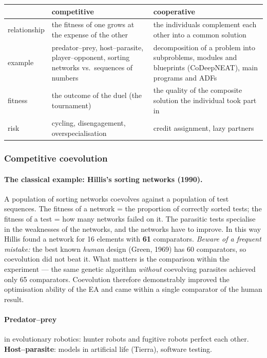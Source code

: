 \documentclass[11pt,a4paper]{article}
\theoremstyle{definition}
\begin{document}
\begin{center}
\begin{tabular}{@{}p{3cm}p{6cm}p{6cm}@{}}
\toprule
 & \textbf{competitive} & \textbf{cooperative} \\
\midrule
relationship & the fitness of one grows at the expense of the other &
  the individuals complement each other into a common solution \\
example & predator--prey, host--parasite, player--opponent, sorting networks
  vs.\ sequences of numbers & decomposition of a problem into subproblems,
  modules and blueprints (CoDeepNEAT), main programs and ADFs \\
fitness & the outcome of the duel (the tournament) & the quality of the
  composite solution the individual took part in \\
risk & cycling, disengagement, overspecialisation & credit assignment, lazy
  partners \\
\bottomrule
\end{tabular}
\end{center}

\subsubsection{Competitive coevolution}

\paragraph{The classical example: Hillis's sorting networks (1990).} A
population of sorting networks coevolves against a population of test sequences.
The fitness of a network = the proportion of correctly sorted tests; the fitness
of a test = how many networks failed on it. The parasitic tests specialise in
the weaknesses of the networks, and the networks have to improve. In this way
Hillis found a network for 16 elements with \textbf{61} comparators.
\emph{Beware of a frequent mistake:} the best known \emph{human} design (Green,
1969) has 60 comparators, so coevolution did not beat it. What matters is the
comparison within the experiment --- the same genetic algorithm \emph{without}
coevolving parasites achieved only 65 comparators. Coevolution therefore
demonstrably improved the optimisation ability of the EA and came within a
single comparator of the human result.

\paragraph{Predator--prey} in evolutionary robotics: hunter robots and fugitive
robots perfect each other. \textbf{Host--parasite}: models in artificial life
(Tierra), software testing.
\end{document}
